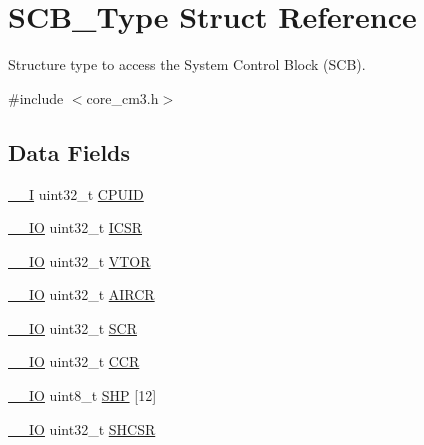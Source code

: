 \hypertarget{structSCB__Type}{\section{S\-C\-B\-\_\-\-Type Struct Reference}
\label{structSCB__Type}
}


Structure type to access the System Control Block (S\-C\-B).  




{\ttfamily \#include $<$core\-\_\-cm3.\-h$>$}

\subsection*{Data Fields}
\begin{DoxyCompactItemize}
\item 
\hyperlink{core__cm3_8h_af63697ed9952cc71e1225efe205f6cd3}{\-\_\-\-\_\-\-I} uint32\-\_\-t \hyperlink{structSCB__Type_afa7a9ee34dfa1da0b60b4525da285032}{C\-P\-U\-I\-D}
\item 
\hyperlink{core__cm3_8h_aec43007d9998a0a0e01faede4133d6be}{\-\_\-\-\_\-\-I\-O} uint32\-\_\-t \hyperlink{structSCB__Type_a3e66570ab689d28aebefa7e84e85dc4a}{I\-C\-S\-R}
\item 
\hyperlink{core__cm3_8h_aec43007d9998a0a0e01faede4133d6be}{\-\_\-\-\_\-\-I\-O} uint32\-\_\-t \hyperlink{structSCB__Type_a0faf96f964931cadfb71cfa54e051f6f}{V\-T\-O\-R}
\item 
\hyperlink{core__cm3_8h_aec43007d9998a0a0e01faede4133d6be}{\-\_\-\-\_\-\-I\-O} uint32\-\_\-t \hyperlink{structSCB__Type_a6ed3c9064013343ea9fd0a73a734f29d}{A\-I\-R\-C\-R}
\item 
\hyperlink{core__cm3_8h_aec43007d9998a0a0e01faede4133d6be}{\-\_\-\-\_\-\-I\-O} uint32\-\_\-t \hyperlink{structSCB__Type_abfad14e7b4534d73d329819625d77a16}{S\-C\-R}
\item 
\hyperlink{core__cm3_8h_aec43007d9998a0a0e01faede4133d6be}{\-\_\-\-\_\-\-I\-O} uint32\-\_\-t \hyperlink{structSCB__Type_a6d273c6b90bad15c91dfbbad0f6e92d8}{C\-C\-R}
\item 
\hyperlink{core__cm3_8h_aec43007d9998a0a0e01faede4133d6be}{\-\_\-\-\_\-\-I\-O} uint8\-\_\-t \hyperlink{structSCB__Type_af6336103f8be0cab29de51daed5a65f4}{S\-H\-P} \mbox{[}12\mbox{]}
\item 
\hyperlink{core__cm3_8h_aec43007d9998a0a0e01faede4133d6be}{\-\_\-\-\_\-\-I\-O} uint32\-\_\-t \hyperlink{structSCB__Type_ae9891a59abbe51b0b2067ca507ca212f}{S\-H\-C\-S\-R}
\item 

\end{DoxyCompactItemize}
